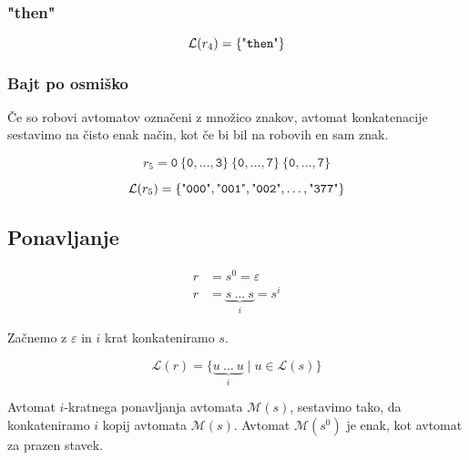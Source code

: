 \documentclass{article}
\newcommand{\Null}{\varepsilon}
\newcommand{\Language}[1]{\mathcal{L}(#1)}
\newcommand{\Automaton}[1]{\mathcal{M}(#1)}
\newcommand{\Str}[1]{\text{\textquotedbl\texttt{#1}\textquotedbl}}
\newcommand{\Char}[1]{\texttt{#1}}
\newcommand{\Seq}{\ }
\newcommand{\Rep}[2]{#1^#2}
\begin{document}
\subsubsection{"then"}
\begin{equation*}
  \Language{r_4} = \{ \Str{then} \}
\end{equation*}

\subsubsection{Bajt po osmiško}
Če so robovi avtomatov označeni z množico znakov, avtomat konkatenacije sestavimo na čisto enak način, kot če bi bil na robovih en sam znak.

\begin{equation*}
  r_5 = \Char{0} \Seq \{\Char{0}, \dots, \Char{3}\} \Seq \{\Char{0}, \dots, \Char{7}\} \Seq \{\Char{0}, \dots, \Char{7}\}
\end{equation*}

\begin{equation*}
  \Language{r_5} = \{ \Str{000}, \Str{001}, \Str{002}, \dots, \Str{377} \}
\end{equation*}

\subsection{Ponavljanje}

\begin{align*}
  r &= \Rep{s}{0} = \Null\\
  r &= \underbrace{s \Seq \ldots \Seq s}_{i} = \Rep{s}{i}
\end{align*}

Začnemo z $\Null$ in $i$ krat konkateniramo $s$.

\begin{equation*}
  \Language{r} = \{ \underbrace{u \Seq \ldots \Seq u}_{i} \mid u \in \Language{s}\}
\end{equation*}

Avtomat $i$-kratnega ponavljanja avtomata $\Automaton{s}$, sestavimo tako, da konkateniramo $i$ kopij avtomata $\Automaton{s}$.
Avtomat $\Automaton{s^0}$ je enak, kot avtomat za prazen stavek.
\end{document}

